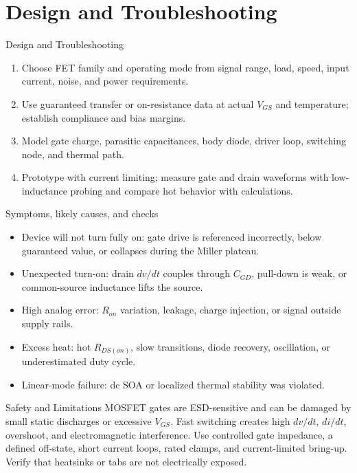 \documentclass[10pt,letterpaper]{article}
\begin{document}
\section{Design and Troubleshooting}
\begin{CornellExamBox}{Design and Troubleshooting}
\begin{enumerate}
  \item Choose FET family and operating mode from signal range, load, speed, input current, noise, and power requirements.
  \item Use guaranteed transfer or on-resistance data at actual $V_{GS}$ and temperature; establish compliance and bias margins.
  \item Model gate charge, parasitic capacitances, body diode, driver loop, switching node, and thermal path.
  \item Prototype with current limiting; measure gate and drain waveforms with low-inductance probing and compare hot behavior with calculations.
\end{enumerate}\end{CornellExamBox}
\begin{CornellExamBox}{Symptoms, likely causes, and checks}
\begin{itemize}
  \item Device will not turn fully on: gate drive is referenced incorrectly, below guaranteed value, or collapses during the Miller plateau.
  \item Unexpected turn-on: drain $dv/dt$ couples through $C_{GD}$, pull-down is weak, or common-source inductance lifts the source.
  \item High analog error: $R_{on}$ variation, leakage, charge injection, or signal outside supply rails.
  \item Excess heat: hot $R_{DS(on)}$, slow transitions, diode recovery, oscillation, or underestimated duty cycle.
  \item Linear-mode failure: dc SOA or localized thermal stability was violated.
\end{itemize}\end{CornellExamBox}
\begin{CornellWarningBox}{Safety and Limitations}
MOSFET gates are ESD-sensitive and can be damaged by small static discharges or excessive $V_{GS}$. Fast switching creates high $dv/dt$, $di/dt$, overshoot, and electromagnetic interference. Use controlled gate impedance, a defined off-state, short current loops, rated clamps, and current-limited bring-up. Verify that heatsinks or tabs are not electrically exposed.
\end{CornellWarningBox}
\end{document}
